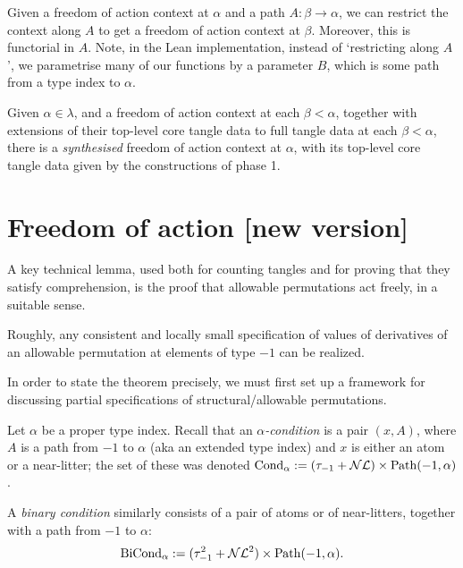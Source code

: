 \begin{definition}
  \label{def:restrict-foa-context}
  \leanok
  Given a freedom of action context at $\alpha$ and a path $A : \beta \to \alpha$, we can restrict the context along $A$ to get a freedom of action context at $\beta$.
  Moreover, this is functorial in $A$.
  Note, in the Lean implementation, instead of `restricting along $A$', we parametrise many of our functions by a parameter $B$, which is some path from a type index to $\alpha$.
\end{definition}

\begin{definition}
  \label{def:synthesise-foa-context}
  Given $\alpha \in \lambda$, and a freedom of action context at each $\beta < \alpha$, together with extensions of their top-level core tangle data to full tangle data at each $\beta < \alpha$, there is a \emph{synthesised} freedom of action context at $\alpha$, with its top-level core tangle data given by the constructions of phase 1.
\end{definition}

\section{Freedom of action [new version]}

A key technical lemma, used both for counting tangles and for proving that they satisfy comprehension, is the proof that allowable permutations act freely, in a suitable sense.

Roughly, any consistent and locally small specification of values of derivatives of an allowable permutation at elements of type $-1$ can be realized.

In order to state the theorem precisely, we must first set up a framework for discussing partial specifications of structural/allowable permutations.

\begin{definition}
  \label{def:binary-condition}
  \leanok
  Let $\alpha$ be a proper type index. Recall that an \emph{$\alpha$-condition} is a pair $(x,A)$, where $A$ is a path from $-1$ to $\alpha$ (aka an extended type index) and $x$ is either an atom or a near-litter; the set of these was denoted $\mathrm{Cond}_\alpha := (\tau_{-1} + \mathcal{NL}) \times \mathrm{Path}(-1,\alpha)$.

  A \emph{binary condition} similarly consists of a pair of atoms or of near-litters, together with a path from $-1$ to $\alpha$:
  \[ \mathrm{BiCond}_\alpha := (\tau_{-1}^2 + \mathcal{NL}^2) \times \mathrm{Path}(-1,\alpha).\]
\end{definition}

